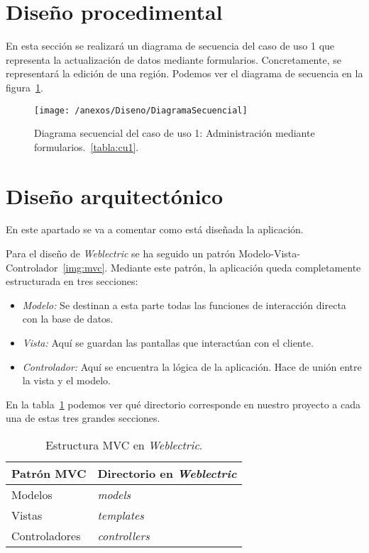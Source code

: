 \newpage

\section{Diseño procedimental}

En esta sección se realizará un diagrama de secuencia del caso de uso 1 que representa la actualización de datos mediante formularios. Concretamente, se representará la edición de una región. Podemos ver el diagrama de secuencia en la figura~\ref{img:modeloSecuencial}.

\begin{figure}[h]
	\centering
	\texttt{[image: /anexos/Diseno/DiagramaSecuencial]}
	\caption{Diagrama secuencial del caso de uso 1: Administración mediante formularios.~\ref{tabla:cu1}.}
	\label{img:modeloSecuencial}
\end{figure}

\newpage

\section{Diseño arquitectónico}

En este apartado se va a comentar como está diseñada la aplicación.

Para el diseño de \textit{Weblectric} se ha seguido un patrón Modelo-Vista-Controlador~\ref{img:mvc}. Mediante este patrón, la aplicación queda completamente estructurada en tres secciones:

\begin{itemize}
	
	\item \textit{Modelo:} Se destinan a esta parte todas las funciones de interacción directa con la base de datos.
	
	\item \textit{Vista:} Aquí se guardan las pantallas que interactúan con el cliente.
	
	\item \textit{Controlador:} Aquí se encuentra la lógica de la aplicación. Hace de unión entre la vista y el modelo.

\end{itemize}

En la tabla~\ref{tabla:estructuraMVC} podemos ver qué directorio corresponde en nuestro proyecto a cada una de estas tres grandes secciones.

\begin{table}[h]
	\centering
	\caption{Estructura MVC en \textit{Weblectric}.}
	\label{tabla:estructuraMVC}
	\begin{tabular}{p{5cm} p{5cm}}
		\toprule
		Patrón MVC 					 & Directorio en \textit{Weblectric}  \\ \midrule
		Modelos			        	 & \textit{models} 			    \\ 
		Vistas						 & \textit{templates}		    \\
		Controladores          		 & \textit{controllers}		 	\\ \bottomrule
	\end{tabular}
\end{table}

